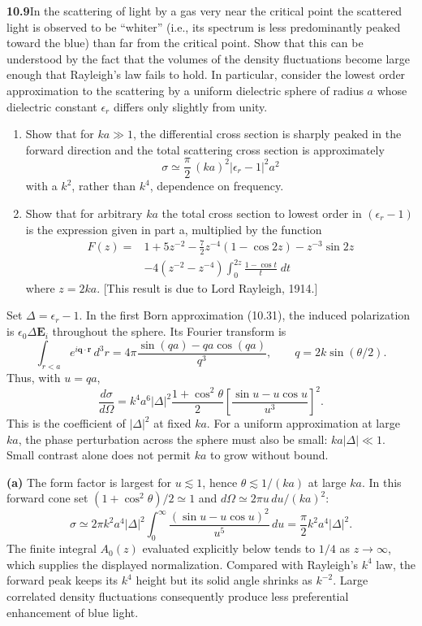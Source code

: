 \par\bigskip
\noindent\textbf{10.9}\quad In the scattering of light by a gas very near the critical point the scattered light is observed to be ``whiter'' (i.e., its spectrum is less predominantly peaked toward the blue) than far from the critical point. Show that this can be understood by the fact that the volumes of the density fluctuations become large enough that Rayleigh's law fails to hold. In particular, consider the lowest order approximation to the scattering by a uniform dielectric sphere of radius $a$ whose dielectric constant $\epsilon_{r}$ differs only slightly from unity.
\begin{enumerate}
\item[(a)] Show that for $ka\gg1$, the differential cross section is sharply peaked in the forward direction and the total scattering cross section is approximately
\[
\sigma\simeq\frac{\pi}{2}\,(ka)^{2}|\epsilon_{r}-1|^{2}a^{2}
\]
with a $k^{2}$, rather than $k^{4}$, dependence on frequency.
\item[(b)] Show that for arbitrary $ka$ the total cross section to lowest order in $(\epsilon_{r}-1)$ is the expression given in part a, multiplied by the function
\begin{align*}
F(z)={}&1+5z^{-2}-\tfrac{7}{2}z^{-4}(1-\cos2z)-z^{-3}\sin2z\\
&-4(z^{-2}-z^{-4})\int_{0}^{2z}\frac{1-\cos t}{t}\;dt
\end{align*}
where $z=2ka$. [This result is due to Lord Rayleigh, 1914.]
\end{enumerate}
\solution
Set $\Delta=\epsilon_r-1$. In the first Born approximation (10.31),
the induced polarization is $\epsilon_0\Delta\mathbf E_i$ throughout
the sphere. Its Fourier transform is
\[
\int_{r<a}e^{i\mathbf q\cdot\mathbf r}\,d^3r
=4\pi\frac{\sin(qa)-qa\cos(qa)}{q^3},\qquad
q=2k\sin(\theta/2).
\]
Thus, with $u=qa$,
\[
\frac{d\sigma}{d\Omega}
=k^4a^6|\Delta|^2\frac{1+\cos^2\theta}{2}
\left[\frac{\sin u-u\cos u}{u^3}\right]^2 .
\]
This is the coefficient of $|\Delta|^2$ at fixed $ka$.
For a uniform approximation at large $ka$, the phase perturbation across
the sphere must also be small: $ka|\Delta|\ll1$. Small contrast alone
does not permit $ka$ to grow without bound.

\textbf{(a)} The form factor is largest for $u\lesssim1$, hence
$\theta\lesssim1/(ka)$ at large $ka$. In this forward cone set
$(1+\cos^2\theta)/2\simeq1$ and $d\Omega\simeq2\pi u\,du/(ka)^2$:
\[
\sigma\simeq2\pi k^2a^4|\Delta|^2
\int_0^\infty\frac{(\sin u-u\cos u)^2}{u^5}\,du
=\boxed{\frac{\pi}{2}k^2a^4|\Delta|^2}.
\]
The finite integral $A_0(z)$ evaluated explicitly below tends to $1/4$
as $z\to\infty$, which supplies the displayed normalization. Compared with Rayleigh's $k^4$ law, the
forward peak keeps its $k^4$ height but its solid angle shrinks as $k^{-2}$.
Large correlated density fluctuations consequently produce less
preferential enhancement of blue light.

